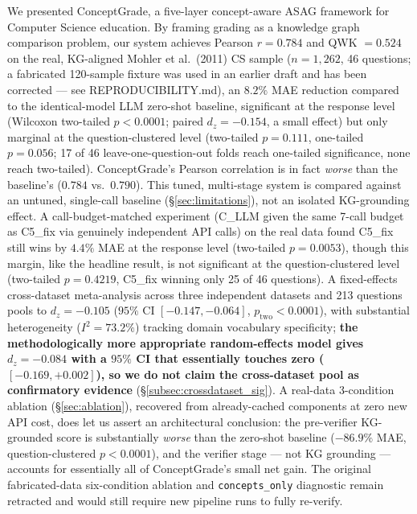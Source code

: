 \documentclass[conference]{IEEEtran}
\begin{document}
We presented ConceptGrade, a five-layer concept-aware ASAG framework for Computer
Science education. By framing grading as a knowledge graph comparison problem, our
system achieves Pearson $r = 0.784$ and QWK $= 0.524$ on the real, KG-aligned
Mohler et al.\ (2011) CS sample ($n = 1{,}262$, 46 questions; a fabricated
120-sample fixture was used in an earlier draft and has been corrected
--- see REPRODUCIBILITY.md), an $8.2\%$ MAE reduction compared to the
identical-model LLM zero-shot baseline, significant at the response level
(Wilcoxon two-tailed $p<0.0001$; paired $d_z=-0.154$, a small effect) but
only marginal at the question-clustered level (two-tailed $p=0.111$,
one-tailed $p=0.056$; 17 of 46 leave-one-question-out folds reach
one-tailed significance, none reach two-tailed). ConceptGrade's Pearson
correlation is in fact \emph{worse} than the baseline's ($0.784$ vs.\
$0.790$). This tuned,
multi-stage system is compared against an untuned, single-call baseline
(\S\ref{sec:limitations}), not an isolated KG-grounding effect. A
call-budget-matched experiment (C\_LLM given the same 7-call budget as
C5\_fix via genuinely independent API calls) on the real data found
C5\_fix still wins by $4.4\%$ MAE at the response level
(two-tailed $p=0.0053$), though this margin, like the headline result,
is not significant at the question-clustered level (two-tailed
$p=0.4219$, C5\_fix winning only 25 of 46 questions). A fixed-effects cross-dataset
meta-analysis across three independent datasets and 213 questions pools to
$d_z = -0.105$ ($95\%$ CI $[-0.147, -0.064]$, $p_{\text{two}} < 0.0001$), with
substantial heterogeneity ($I^2 = 73.2\%$) tracking domain vocabulary
specificity; \textbf{the methodologically more appropriate random-effects
model gives $d_z=-0.084$ with a $95\%$ CI that essentially touches zero
($[-0.169, +0.002]$), so we do not claim the cross-dataset pool as
confirmatory evidence} (\S\ref{subsec:crossdataset_sig}). A real-data
3-condition ablation (\S\ref{sec:ablation}), recovered from already-cached
components at zero new API cost, does let us assert an architectural
conclusion: the pre-verifier KG-grounded score is substantially
\emph{worse} than the zero-shot baseline ($-86.9\%$ MAE, question-clustered
$p<0.0001$), and the verifier stage --- not KG grounding --- accounts for
essentially all of ConceptGrade's small net gain. The original
fabricated-data six-condition ablation and \texttt{concepts\_only}
diagnostic remain retracted and would still require new pipeline runs to
fully re-verify.
\end{document}
